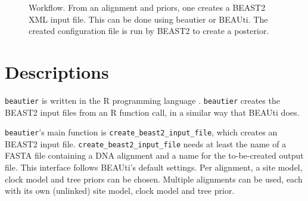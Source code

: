 \documentclass{article}
\begin{document}
\begin{figure}

  \caption{
    Workflow. From an alignment and priors, one creates a BEAST2 XML input file. This
    can be done using beautier or BEAUti. The created configuration file is run by BEAST2
    to create a posterior.
  }
  \label{fig:workflow}
\end{figure}

\section{Descriptions}

\verb;beautier; is written in the R programming language \cite{R}.
\verb;beautier; creates the BEAST2 input files from an R function call,
in a similar way that BEAUti does.

\verb;beautier;'s main function is \verb;create_beast2_input_file;, which creates
an BEAST2 input file. \verb;create_beast2_input_file; needs at least the name of a FASTA file containing a DNA alignment
and a name for the to-be-created output file. This interface follows BEAUti's default settings.
Per alignment, a site model, clock model and tree priors can be chosen.
Multiple alignments can be used, each with its own (unlinked) site model, clock model and tree prior.
\end{document}
